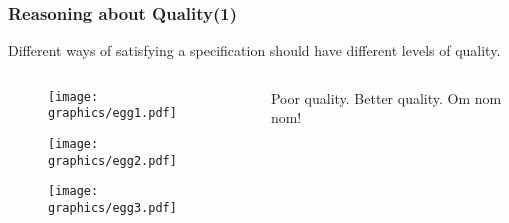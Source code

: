 \begin{frame}
	\frametitle{Reasoning about Quality(1)}
	Different ways of satisfying a specification should have different levels of quality.
	
		\begin{columns}
			\begin{column}{0.45\textwidth}
				\begin{overprint}	
					\begin{figure}[tbp]
						\texttt{[image: graphics/egg1.pdf]}
					\end{figure}
					
					\begin{figure}[tbp]
						\texttt{[image: graphics/egg2.pdf]}
					\end{figure}
					
					\begin{figure}[tbp]
						\texttt{[image: graphics/egg3.pdf]}
					\end{figure}
				\end{overprint}	
			\end{column}
			\begin{column}{0.45\textwidth}
				\begin{overprint}
					
					\onslide<3| handout:0>
					Poor quality.		
					\onslide<4| handout:0>
					Better quality.
					\onslide<5| handout:0>
					Om nom nom!
					
				\end{overprint}	
			\end{column}
		\end{columns}
\end{frame}



